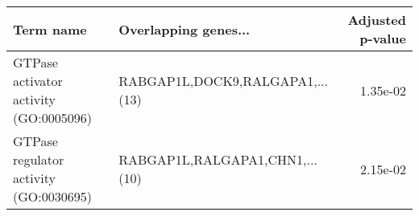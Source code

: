 \begin{tabular}{llr}
\toprule
                             Term name &            Overlapping genes... &  Adjusted p-value \\
\midrule
GTPase activator activity (GO:0005096) & RABGAP1L,DOCK9,RALGAPA1,...(13) &          1.35e-02 \\
GTPase regulator activity (GO:0030695) &  RABGAP1L,RALGAPA1,CHN1,...(10) &          2.15e-02 \\
\bottomrule
\end{tabular}
